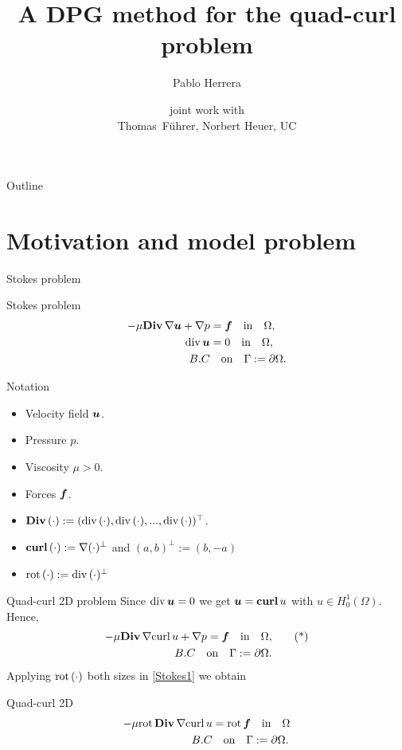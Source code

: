 \documentclass[10pt]{beamer}
\title[Short Title]{A DPG method for the quad-curl problem}
\author{Pablo Herrera}
\institute{P. Universidad Cat\'olica de Chile, Santiago, Chile}
\date{{\footnotesize joint work with}\\[1em]
      {\small Thomas~F\"uhrer, Norbert Heuer, UC}
     }
\begin{document}
\begin{frame}
\titlepage
\end{frame}
\begin{frame}{Outline}
    \tableofcontents
\end{frame}
\section{Motivation and model problem}
\begin{frame}[t]{Stokes problem}
\begin{block}{Stokes problem}
    \begin{align*}
        -\mu \Div \grad \bu + \grad p  &= \ff \quad \text{in} \quad \Omega, \\
        \div \bu & = 0  \quad \text{in} \quad \Omega, \\
        \hspace{5em}\centering{B.C}& \quad \text{on} \quad \Gamma:=\partial \Omega. 
    \end{align*}
\end{block}
\pause 
\begin{block}{Notation}
\begin{itemize}
    \item Velocity field $\boldsymbol{u}$. 
    \item Pressure $p$. 
    \item Viscosity $\mu>0$. 
    \item Forces $\boldsymbol{f}$.
    \item ${\rm\bf Div\,}(\cdot) := ({\rm div\,} (\cdot) , {\rm div\,} (\cdot),..., {\rm div\,} (\cdot))^{\top}$. 
    \item ${\bf curl\,} (\cdot ) :=\nabla(\cdot)^\perp $ and $(a,b)^\perp := (b,-a)$
    \item ${\rm rot\,}(\cdot) := {\rm div\,}(\cdot)^\perp $
\end{itemize}
\end{block}
\end{frame}
\begin{frame}{Quad-curl 2D problem} 
Since ${\rm div\,} \boldsymbol{u} = 0 $ we get $\boldsymbol{u} = {\bf curl\,} u$ with $u \in H^1_0(\Omega)$.  Hence,    
\pause 
\begin{align}
        -\mu \Div \grad \curl u + \grad p  = \ff \quad \text{in} \quad \Omega, & \tag{*} \label{Stokes1}\\
        \centering{B.C} \quad \text{on} \quad \Gamma:=\partial \Omega. &  \notag
\end{align}
Applying ${\rm rot\,}(\cdot )$ both sizes in \eqref{Stokes1} we obtain
\pause 
\begin{block}{Quad-curl 2D}
    \begin{align*}
        -\mu \rot \Div \grad \curl u &= \rot \ff \quad \text{in} \quad \Omega \\
        \centering{B.C}& \quad \text{on} \quad \Gamma:=\partial \Omega.  \notag
    \end{align*}
\end{block}
\pause 
{} \\
 \pause
\end{frame}
\end{document}
